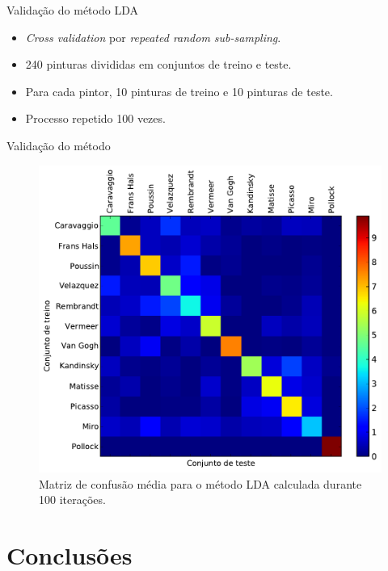 \documentclass{beamer}
\begin{document}

\begin{frame}{Validação do método LDA}
  \begin{itemize}
    \item \textit{Cross validation} por \textit{repeated random sub-sampling}.

    \item 240 pinturas divididas em conjuntos de treino e teste.

    \item Para cada pintor, 10 pinturas de treino e 10 pinturas de teste.

    \item Processo repetido 100 vezes.
  \end{itemize}
\end{frame}

\begin{frame}{Validação do método}
\begin{figure}[h!]
\begin{center}
\includegraphics[width=.6\textwidth]{figs/matriz_confusao} 
      \caption{Matriz de confusão média para o método LDA calculada
        durante 100 iterações.}  \label{fig:cm}
\end{center}
\end{figure}
\end{frame}


\section{Conclusões}

\end{document}
